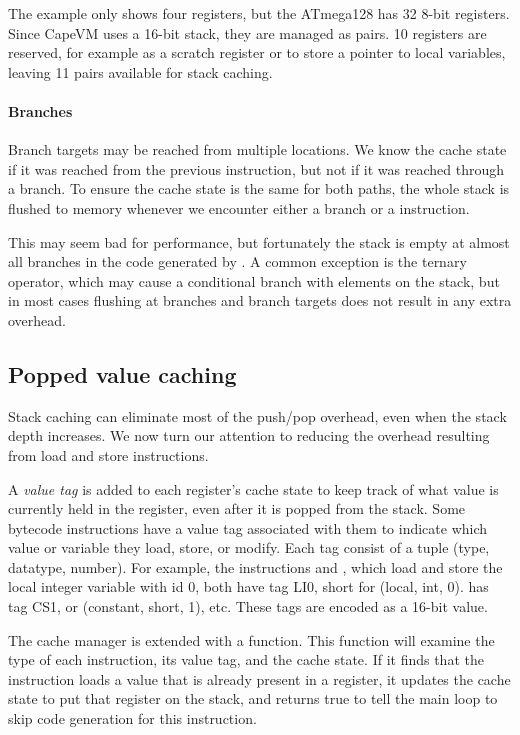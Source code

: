 The example only shows four registers, but the ATmega128 has 32 8-bit registers. Since CapeVM uses a 16-bit stack, they are managed as pairs. 10 registers are reserved, for example as a scratch register or to store a pointer to local variables, leaving 11 pairs available for stack caching.

\paragraph{Branches} Branch targets may be reached from multiple locations. We know the cache state if it was reached from the previous instruction, but not if it was reached through a branch. To ensure the cache state is the same for both paths, the whole stack is flushed to memory whenever we encounter either a branch or a  instruction. 

This may seem bad for performance, but fortunately the stack is empty at almost all branches in the code generated by . A common exception is the ternary  operator, which may cause a conditional branch with elements on the stack, but in most cases flushing at branches and branch targets does not result in any extra overhead.

\subsection{Popped value caching}
\label{sec-optimisations-popped-value-caching}


Stack caching can eliminate most of the push/pop overhead, even when the stack depth increases. We now turn our attention to reducing the overhead resulting from load and store instructions.

A \emph{value tag} is added to each register's cache state to keep track of what value is currently held in the register, even after it is popped from the stack. Some bytecode instructions have a value tag associated with them to indicate which value or variable they load, store, or modify. Each tag consist of a tuple (type, datatype, number). For example, the instructions  and , which load and store the local integer variable with id 0, both have tag LI0, short for (local, int, 0).  has tag CS1, or (constant, short, 1), etc. These tags are encoded as a 16-bit value.

The cache manager is extended with a  function. This function will examine the type of each instruction, its value tag, and the cache state. If it finds that the instruction loads a value that is already present in a register, it updates the cache state to put that register on the stack, and returns true to tell the main loop to skip code generation for this instruction.

